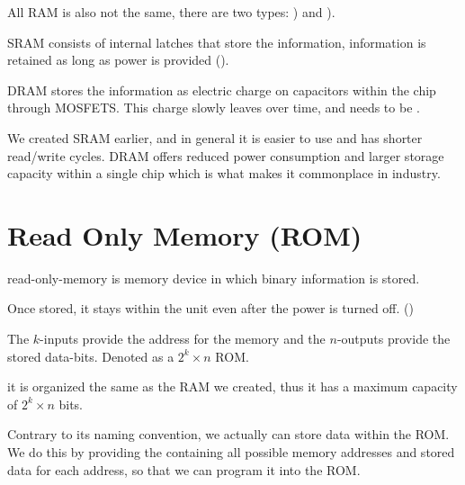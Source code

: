 All RAM is also not the same, there are two types: ) and ).
\begin{bullets}
	\item SRAM consists of internal latches that store the information, information is retained as long as power is provided ().
	\item DRAM stores the information as electric charge on capacitors within the chip through MOSFETS. This charge slowly leaves over time, and needs to be .
\end{bullets}
We created SRAM earlier, and in general it is easier to use and has shorter read/write cycles. DRAM offers reduced power consumption and larger storage capacity within a single chip which is what makes it commonplace in industry.

\section{Read Only Memory (ROM)}

read-only-memory is memory device in which  binary information is stored.
\begin{bullets}
	\item Once stored, it stays within the unit even after the power is turned off. ()
	\item The $k$-inputs provide the address for the memory and the $n$-outputs provide the stored data-bits. Denoted as a $2^k \times n$ ROM.
	\item it is organized the same as the RAM we created, thus it has a maximum capacity of $2^k \times n$ bits.
\end{bullets}

Contrary to its naming convention, we actually can store data within the ROM. We do this by providing the  containing all possible memory addresses and stored data for each address, so that we can program it into the ROM. 



